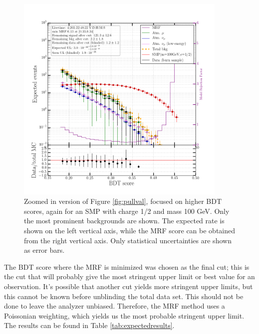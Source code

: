 \begin{figure}
\centering
\includegraphics[width=0.9\textwidth]{chapter8/img/ModelRejectionFactor_percentile_0p9_signal_m_100_ch_1ovr2_noSYST.png}
\caption{Zoomed in version of Figure \ref{fig:pullval}, focused on higher BDT scores, again for an SMP with charge 1/2 and mass 100 GeV. Only the most prominent backgrounds are shown. The expected rate is shown on the left vertical axis, while the MRF score can be obtained from the right vertical axis. Only statistical uncertainties are shown as error bars.}
\label{fig:mrf}
\end{figure}

\noindent The BDT score where the MRF is minimized was chosen as the final cut; this is the cut that will probably give the most stringent upper limit or best value for an observation. It's possible that another cut yields more stringent upper limits, but this cannot be known before unblinding the total data set. This should not be done to leave the analyzer unbiased. Therefore, the MRF method uses a Poissonian weighting, which yields us the most probable stringent upper limit. The results can be found in Table \ref{tab:expectedresults}.

